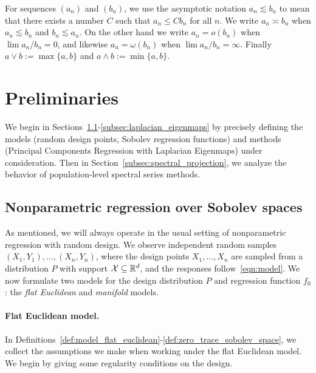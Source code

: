 For sequences $(a_n)$ and $(b_n)$, we use the asymptotic notation $a_n \lesssim b_n$ to mean that there exists a number $C$ such that $a_n \leq C b_n$ for all $n$. We write $a_n \asymp b_n$ when $a_n \lesssim b_n$ and $b_n \lesssim a_n$. On the other hand we write $a_n = o(b_n)$ when $\lim a_n/b_n = 0$, and likewise $a_n = \omega(b_n)$ when $\lim a_n/b_n = \infty$. Finally $a \vee b := \max\{a,b\}$ and $a \wedge b := \min\{a,b\}$.

\section{Preliminaries}
\label{sec:setup_main_results}

We begin in Sections~\ref{subsec:regression_laplacian_eigenmaps}-\ref{subsec:laplacian_eigenmaps} by precisely defining the models (random design points, Sobolev regression functions) and methods (Principal Components Regression with Laplacian Eigenmaps) under consideration. Then in Section~\ref{subsec:spectral_projection}, we analyze the behavior of population-level spectral series methods.

\subsection{Nonparametric regression over Sobolev spaces}
\label{subsec:regression_laplacian_eigenmaps}

As mentioned, we will always operate in the usual setting of nonparametric regression with random design. We observe independent random samples $(X_1,Y_1),\ldots,(X_n,Y_n)$, where the design points $X_1,\ldots,X_n$ are sampled from a distribution $P$ with support $\mathcal{X} \subseteq \mathbb{R}^d$, and the responses follow~\eqref{eqn:model}. We now formulate two models for the design distribution $P$ and regression function $f_0$: the \emph{flat Euclidean} and \emph{manifold} models.

\paragraph{Flat Euclidean model.}
In Definitions~\ref{def:model_flat_euclidean}-\ref{def:zero_trace_sobolev_space}, we collect the assumptions we make when working under the flat Euclidean model. We begin by giving some regularity conditions on the design.

